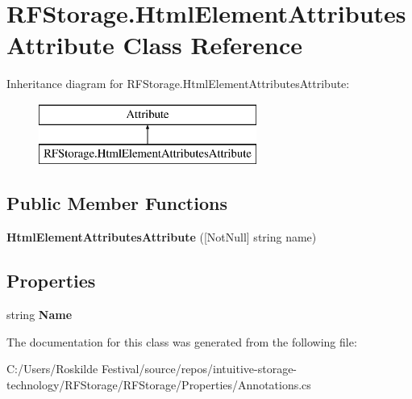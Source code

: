 \section{R\+F\+Storage.\+Html\+Element\+Attributes\+Attribute Class Reference}
\label{class_r_f_storage_1_1_html_element_attributes_attribute}
Inheritance diagram for R\+F\+Storage.\+Html\+Element\+Attributes\+Attribute\+:\begin{figure}[H]
\begin{center}
\leavevmode
\includegraphics[height=2.000000cm]{class_r_f_storage_1_1_html_element_attributes_attribute}
\end{center}
\end{figure}
\subsection*{Public Member Functions}
\begin{DoxyCompactItemize}
\item 
\mbox{\label{class_r_f_storage_1_1_html_element_attributes_attribute_a2f8df01a6544f5dd84b99a2863ee5eb5}} 
{\bfseries Html\+Element\+Attributes\+Attribute} ([Not\+Null] string name)
\end{DoxyCompactItemize}
\subsection*{Properties}
\begin{DoxyCompactItemize}
\item 
\mbox{\label{class_r_f_storage_1_1_html_element_attributes_attribute_aeff0bb51e5ae3bc3dad0f2fedb108cf9}} 
string {\bfseries Name}\hspace{0.3cm}{\ttfamily  [get]}
\end{DoxyCompactItemize}


The documentation for this class was generated from the following file\+:\begin{DoxyCompactItemize}
\item 
C\+:/\+Users/\+Roskilde Festival/source/repos/intuitive-\/storage-\/technology/\+R\+F\+Storage/\+R\+F\+Storage/\+Properties/Annotations.\+cs\end{DoxyCompactItemize}
